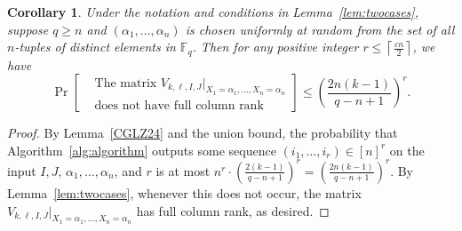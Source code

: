 \documentclass[11pt]{article}
\theoremstyle{plain}
\newtheorem{cor}[thm]{Corollary}
\theoremstyle{definition}
\theoremstyle{remark}
\newcommand{\F}{\mathbb{F}}
\newcommand{\ceil}[1]{\left\lceil #1 \right\rceil}
\begin{document}
\begin{cor}\label{cor:fullrankprob}
Under the notation and conditions in Lemma~\ref{lem:twocases}, suppose $q\geq n$ and $(\alpha_1,\dots,\alpha_n)$ is chosen uniformly at random from the set of all $n$-tuples of distinct elements in $\F_q$. 
Then for any positive integer $r\le\ceil{\frac{\varepsilon n}{2}}$, we have 
\[
\Pr\left[\begin{aligned}
    &\text{The matrix }V_{k,\ell,I,J}|_{X_1=\alpha_1,\dots,X_{n}=\alpha_{n}}\\
&\text{does not have full column rank}
\end{aligned}\right]\leq 
\left(\frac{2n(k-1)}{q-n+1}\right)^r.
\]
\end{cor}
\begin{proof}
By Lemma~\ref{CGLZ24} and the union bound, the probability that Algorithm~\ref{alg:algorithm} outputs some sequence $(i_1,\dots,i_r)\in [n]^r$ on the input $I,J$, $\alpha_1,\dots,\alpha_n$, and $r$ is at most 
$n^r\cdot\left(\frac{2(k-1)}{q-n+1}\right)^r= \left(\frac{2n(k-1)}{q-n+1}\right)^r.$ By Lemma~\ref{lem:twocases}, whenever this does not occur, the matrix $V_{k,\ell,I,J}|_{X_1=\alpha_1,\dots,X_n=\alpha_n}$ has full column rank, as desired.
\end{proof}
\end{document}
